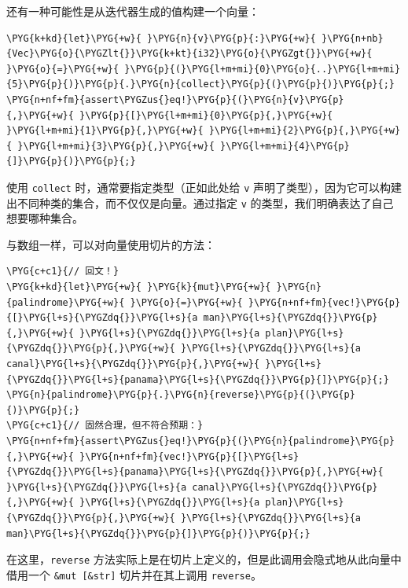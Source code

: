 还有一种可能性是从迭代器生成的值构建一个向量：

\begin{Verbatim}[commandchars=\\\{\},breaklines=true,breakanywhere=true,fontsize=\codefont,xleftmargin=17bp]
\PYG{k+kd}{let}\PYG{+w}{ }\PYG{n}{v}\PYG{p}{:}\PYG{+w}{ }\PYG{n+nb}{Vec}\PYG{o}{\PYGZlt{}}\PYG{k+kt}{i32}\PYG{o}{\PYGZgt{}}\PYG{+w}{ }\PYG{o}{=}\PYG{+w}{ }\PYG{p}{(}\PYG{l+m+mi}{0}\PYG{o}{..}\PYG{l+m+mi}{5}\PYG{p}{)}\PYG{p}{.}\PYG{n}{collect}\PYG{p}{(}\PYG{p}{)}\PYG{p}{;}
\PYG{n+nf+fm}{assert\PYGZus{}eq!}\PYG{p}{(}\PYG{n}{v}\PYG{p}{,}\PYG{+w}{ }\PYG{p}{[}\PYG{l+m+mi}{0}\PYG{p}{,}\PYG{+w}{ }\PYG{l+m+mi}{1}\PYG{p}{,}\PYG{+w}{ }\PYG{l+m+mi}{2}\PYG{p}{,}\PYG{+w}{ }\PYG{l+m+mi}{3}\PYG{p}{,}\PYG{+w}{ }\PYG{l+m+mi}{4}\PYG{p}{]}\PYG{p}{)}\PYG{p}{;}
\end{Verbatim}

使用 \texttt{collect} 时，通常要指定类型（正如此处给 \texttt{v} 声明了类型），因为它可以构建出不同种类的集合，而不仅仅是向量。通过指定 \texttt{v} 的类型，我们明确表达了自己想要哪种集合。

与数组一样，可以对向量使用切片的方法：

\begin{Verbatim}[commandchars=\\\{\},breaklines=true,breakanywhere=true,fontsize=\codefont,xleftmargin=17bp]
\PYG{c+c1}{// 回文！}
\PYG{k+kd}{let}\PYG{+w}{ }\PYG{k}{mut}\PYG{+w}{ }\PYG{n}{palindrome}\PYG{+w}{ }\PYG{o}{=}\PYG{+w}{ }\PYG{n+nf+fm}{vec!}\PYG{p}{[}\PYG{l+s}{\PYGZdq{}}\PYG{l+s}{a man}\PYG{l+s}{\PYGZdq{}}\PYG{p}{,}\PYG{+w}{ }\PYG{l+s}{\PYGZdq{}}\PYG{l+s}{a plan}\PYG{l+s}{\PYGZdq{}}\PYG{p}{,}\PYG{+w}{ }\PYG{l+s}{\PYGZdq{}}\PYG{l+s}{a canal}\PYG{l+s}{\PYGZdq{}}\PYG{p}{,}\PYG{+w}{ }\PYG{l+s}{\PYGZdq{}}\PYG{l+s}{panama}\PYG{l+s}{\PYGZdq{}}\PYG{p}{]}\PYG{p}{;}
\PYG{n}{palindrome}\PYG{p}{.}\PYG{n}{reverse}\PYG{p}{(}\PYG{p}{)}\PYG{p}{;}
\PYG{c+c1}{// 固然合理，但不符合预期：}
\PYG{n+nf+fm}{assert\PYGZus{}eq!}\PYG{p}{(}\PYG{n}{palindrome}\PYG{p}{,}\PYG{+w}{ }\PYG{n+nf+fm}{vec!}\PYG{p}{[}\PYG{l+s}{\PYGZdq{}}\PYG{l+s}{panama}\PYG{l+s}{\PYGZdq{}}\PYG{p}{,}\PYG{+w}{ }\PYG{l+s}{\PYGZdq{}}\PYG{l+s}{a canal}\PYG{l+s}{\PYGZdq{}}\PYG{p}{,}\PYG{+w}{ }\PYG{l+s}{\PYGZdq{}}\PYG{l+s}{a plan}\PYG{l+s}{\PYGZdq{}}\PYG{p}{,}\PYG{+w}{ }\PYG{l+s}{\PYGZdq{}}\PYG{l+s}{a man}\PYG{l+s}{\PYGZdq{}}\PYG{p}{]}\PYG{p}{)}\PYG{p}{;}
\end{Verbatim}

在这里，\texttt{reverse} 方法实际上是在切片上定义的，但是此调用会隐式地从此向量中借用一个 \texttt{\&mut [\&str]} 切片并在其上调用 \texttt{reverse}。

